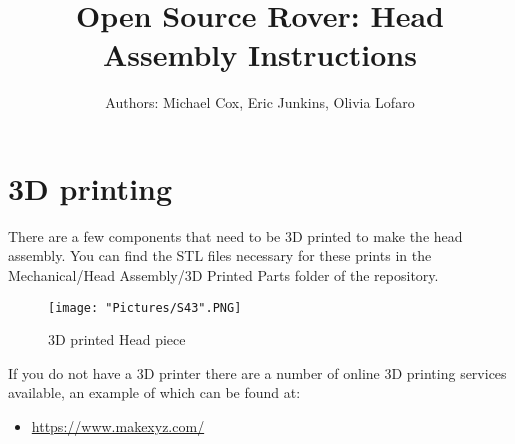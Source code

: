 \documentclass[12pt]{article}
\begin{document}
\newcommand\partimg{\includegraphics[width=2cm,height=1.25cm,keepaspectratio]}


\title{Open Source Rover: Head Assembly Instructions}
\author{Authors: Michael Cox, Eric Junkins, Olivia Lofaro}

\makeatletter
\def\@maketitle{
\begin{center}
	\makebox[\textwidth][c]{ \texttt{[image: "Pictures/finala".png]}}
	{\Huge \bfseries \sffamily \@title }\\[3ex]
	{\Large \sffamily \@author}\\[3ex]
	\texttt{[image: "Pictures/JPL logo".png]}
\end{center}}
\makeatother

\maketitle



\newpage


\tableofcontents

\newpage

\section{3D printing}
There are a few components that need to be 3D printed to make the head assembly. You can find the STL files necessary for these prints in the Mechanical/Head Assembly/3D Printed Parts folder of the repository.

\begin{figure}[H]
	\centering
	\texttt{[image: "Pictures/S43".PNG]}
	\caption{3D printed Head piece}
\end{figure}


If you do not have a 3D printer there are a number of online 3D printing services available, an example of which can be found at:

\begin{itemize}
	\item \href{https://www.makexyz.com/}{https://www.makexyz.com/}
\end{itemize}
\end{document}
